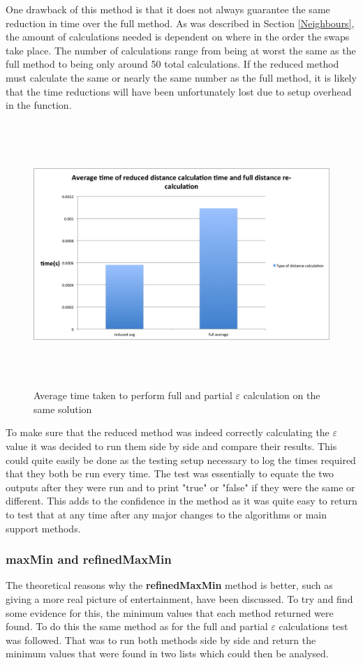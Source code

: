 \documentclass[12pt]{report}
\begin{document}
One drawback of this method is that it does not always guarantee the same reduction in time over the full method. As was described in Section \ref{Neighbours}, the amount of calculations needed is dependent on where in the order the swaps take place. The number of calculations range from being at worst the same as the full method to being only around 50 total calculations. If the reduced method must calculate the same or nearly the same number as the full method, it is likely that the time reductions will have been unfortunately lost due to setup overhead in the function.

\begin{figure}[H]
\centering
\includegraphics[width=18cm, height=10cm]{../code/misc/reducedvsFullDistanceCalc}
\caption{Average time taken to perform full and partial $\varepsilon$ calculation on the same solution}
\label{f_recalcComparison}
\end{figure}

To make sure that the reduced method was indeed correctly calculating the $\varepsilon$ value it was decided to run them side by side and compare their results. This could quite easily be done as the testing setup necessary to log the times required that they both be run every time. The test was essentially to equate the two outputs after they were run and to print "true" or "false" if they were the same or different. This adds to the confidence in the method as it was quite easy to return to test that at any time after any major changes to the algorithms or main support methods.

\subsubsection{maxMin and refinedMaxMin}
The theoretical reasons why the \textbf{refinedMaxMin} method is better, such as giving a more real picture of entertainment, have been discussed. To try and find some evidence for this, the  minimum values that each method returned were found. To do this the same method as for the full and partial $\varepsilon$ calculations test was followed. That was to run both methods side by side and return the minimum values that were found in two lists which could then be analysed.
\end{document}
